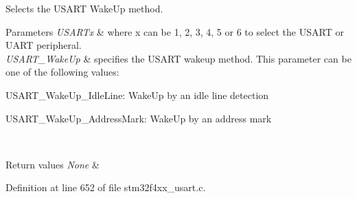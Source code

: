 Selects the U\+S\+A\+RT Wake\+Up method. 


\begin{DoxyParams}{Parameters}
{\em U\+S\+A\+R\+Tx} & where x can be 1, 2, 3, 4, 5 or 6 to select the U\+S\+A\+RT or U\+A\+RT peripheral. \\
\hline
{\em U\+S\+A\+R\+T\+\_\+\+Wake\+Up} & specifies the U\+S\+A\+RT wakeup method. This parameter can be one of the following values\+: \begin{DoxyItemize}
\item U\+S\+A\+R\+T\+\_\+\+Wake\+Up\+\_\+\+Idle\+Line\+: Wake\+Up by an idle line detection \item U\+S\+A\+R\+T\+\_\+\+Wake\+Up\+\_\+\+Address\+Mark\+: Wake\+Up by an address mark \end{DoxyItemize}
\\
\hline
\end{DoxyParams}

\begin{DoxyRetVals}{Return values}
{\em None} & \\
\hline
\end{DoxyRetVals}


Definition at line 652 of file stm32f4xx\+\_\+usart.\+c.

